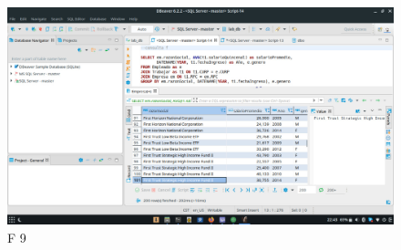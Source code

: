 \documentclass[a4paper, 12pt]{report}
\begin{document}
    \begin{figure}
        \includegraphics[width=\textwidth]
            {img/f9.jpeg}\hfill
    \caption{F 9}
    \end{figure}
\end{document}
